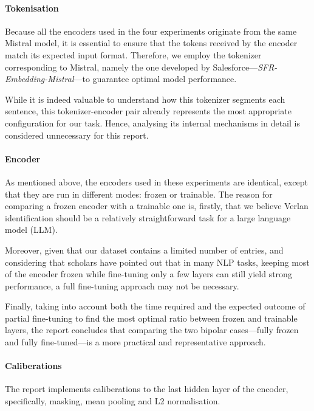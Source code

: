 \documentclass[12pt]{article}
\begin{document}
\paragraph{Tokenisation}
Because all the encoders used in the four experiments originate from the same Mistral model, it is essential to ensure that the tokens received by the encoder match its expected input format. Therefore, we employ the tokenizer corresponding to Mistral, namely the one developed by Salesforce\;---\;\textit{SFR-Embedding-Mistral}\;---\;to guarantee optimal model performance.

While it is indeed valuable to understand how this tokenizer segments each sentence, this tokenizer-encoder pair already represents the most appropriate configuration for our task. Hence, analysing its internal mechanisms in detail is considered unnecessary for this report.

\paragraph{Encoder}
As mentioned above, the encoders used in these experiments are identical, except that they are run in different modes: frozen or trainable. The reason for comparing a frozen encoder with a trainable one is, firstly, that we believe Verlan identification should be a relatively straightforward task for a large language model (LLM). 

Moreover, given that our dataset contains a limited number of entries, and considering that scholars have pointed out that in many NLP tasks, keeping most of the encoder frozen while fine-tuning only a few layers can still yield strong performance\cite{lodha2023surgical}, a full fine-tuning approach may not be necessary. 

Finally, taking into account both the time required and the expected outcome of partial fine-tuning to find the most optimal ratio between frozen and trainable layers, the report concludes that comparing the two bipolar cases\;---\;fully frozen and fully fine-tuned\;---\;is a more practical and representative approach.

\paragraph{Caliberations}

The report implements caliberations to the last hidden layer of the encoder, specifically, masking, mean pooling and L2 normalisation. 
\end{document}
